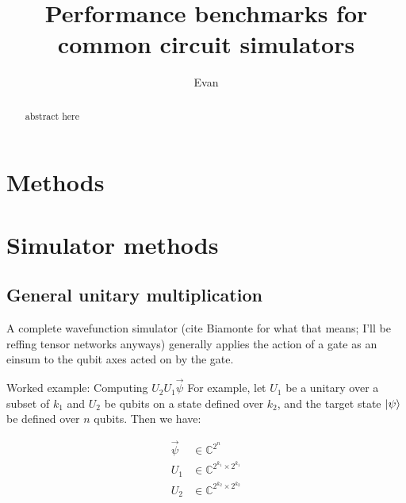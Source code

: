 \documentclass{article}
\title{Performance benchmarks for common circuit simulators}
\author{Evan}
\begin{document}
\maketitle

\begin{abstract}
	abstract here 
\end{abstract}


\newpage
\tableofcontents
\newpage



\section{Methods}
\section{Simulator methods}

\subsection{General unitary multiplication}
\label{sec:fallback3}
A complete wavefunction simulator (cite Biamonte for what that means; I'll be reffing tensor networks anyways) generally applies the action of a gate as an einsum to the qubit axes acted on by the gate.

Worked example: Computing $U_2 U_1 \vec{\psi}$
For example, let $U_1$ be a unitary over a subset of $k_1$ and $U_2$ be qubits on a state defined over $k_2$, and the target state $\ket{\psi}$ be defined over $n$ qubits. Then we have:

\begin{align}
	 \vec{\psi} &\in \mathbb{C}^{2^n} \\
	 U_1 &\in \mathbb{C}^{2^{k_1} \times 2^{k_1}} \\
	 U_2 &\in \mathbb{C}^{2^{k_2} \times 2^{k_2}} \\
\end{align}
\end{document}
